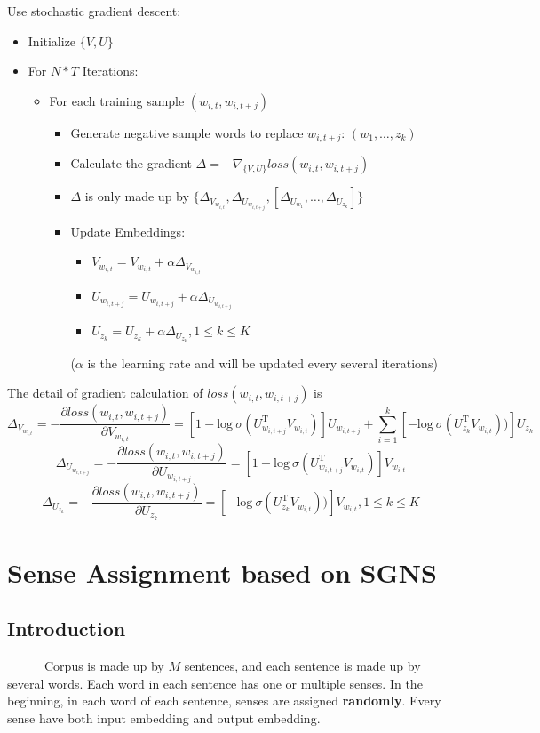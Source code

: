 \documentclass[12pt,a4paper,twoside]{book}
\begin{document}
	Use stochastic gradient descent: 
	\begin{itemize}
	\item Initialize $\{V,U\}$
	\item For $N*T$ Iterations: 
		\begin{itemize}
		\item For each training sample $(w_{i,t},w_{i,{t+j}})$
		\begin{itemize}
		\item Generate negative sample words to replace $w_{i,t+j}$: $(w_1,\ldots,z_k)$
		\item Calculate the gradient $\Delta = -\nabla_{\{V,U\}} loss(w_{i,t},w_{i,{t+j}})$
		\item $\Delta$ is only made up by $\{\Delta_{V_{w_{i,t}}}, \Delta_{U_{w_{i,t+j}}}, [\Delta_{U_{w_1}},\ldots,\Delta_{U_{z_k}}]\}$
		\item Update Embeddings: 
		\begin{itemize}
		\item $V_{w_{i,t}} = V_{w_{i,t}}+\alpha\Delta_{V_{w_{i,t}}}$
		\item $U_{w_{i,t+j}} = U_{w_{i,t+j}}+\alpha\Delta_{U_{w_{i,t+j}}}$
		\item $U_{z_k} = U_{z_k}+\alpha\Delta_{U_{z_k}}, 1\leq k\leq K$ 
		\end{itemize}
		($\alpha$ is the learning rate and will be updated every several iterations)
		\end{itemize}
		\end{itemize}
	\end{itemize}
The detail of gradient calculation of $loss(w_{i,t},w_{i,t+j})$ is
	$$\Delta_{V_{w_{i,t}}} = -\frac{\partial loss(w_{i,t},w_{i,t+j})}{\partial V_{w_{i,t}}} = [1-\mathrm{log}\ \sigma(U_{w_{i,t+j}}^{\mathrm{T}}V_{w_{i,t}})]U_{w_{i,t+j}}+\sum_{i=1}^k [-\mathrm{log}\ \sigma(U_{z_k}^{\mathrm{T}}V_{w_{i,t}}))]U_{z_k}$$
	$$\Delta_{U_{w_{i,t+j}}} = -\frac{\partial loss(w_{i,t},w_{i,t+j})}{\partial U_{w_{i,t+j}}} = [1-\mathrm{log}\ \sigma(U_{w_{i,t+j}}^{\mathrm{T}}V_{w_{i,t}})]V_{w_{i,t}}$$
	$$\Delta_{U_{z_k}} = -\frac{\partial loss(w_{i,t},w_{i,t+j})}{\partial U_{z_k}} = [-\mathrm{log}\ \sigma(U_{z_k}^{\mathrm{T}}V_{w_{i,t}}))]V_{w_{i,t}}, 1\leq k\leq K$$ 

\section{Sense Assignment based on SGNS}
\subsection{Introduction}
\ \ \ \ \ \ Corpus is made up by $M$ sentences, and each sentence is made up by several words. Each word in each sentence has one or multiple senses. In the beginning, in each word of each sentence, senses are assigned \textbf{randomly}. Every sense have both input embedding and output embedding.\\
\end{document}
